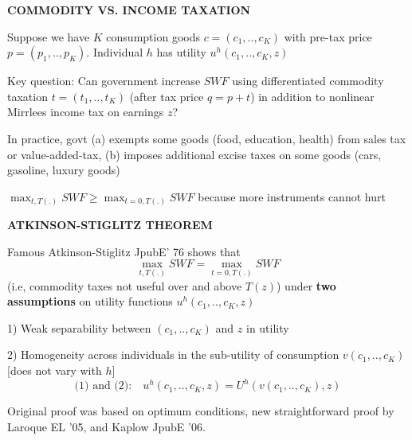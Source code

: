 \documentclass[landscape]{slides}
\begin{document}
\begin{slide}
\begin{center}
{\bf COMMODITY VS. INCOME TAXATION}
\end{center}
Suppose we have $K$ consumption goods $c=(c_1,..,c_K)$ with
pre-tax price $p=(p_1,..,p_K)$. Individual $h$ has utility
$u^h(c_1,..,c_K,z)$

Key question: Can government increase $SWF$ using differentiated
commodity taxation $t=(t_1,..,t_K)$ (after tax price $q=p+t$) in
addition to nonlinear Mirrlees income tax on earnings $z$?

In practice, govt (a) exempts some goods (food, education, health)
from sales tax or value-added-tax, (b) imposes additional excise
taxes on some goods (cars, gasoline, luxury goods)

$\max_{t,T(.)} SWF \geq \max_{t=0,T(.)} SWF$ because more
instruments cannot hurt

\end{slide}

\begin{slide}
\begin{center}
{\bf ATKINSON-STIGLITZ THEOREM }
\end{center}

Famous Atkinson-Stiglitz JpubE' 76 shows that $$\max_{t,T(.)} SWF
= \max_{t=0,T(.)} SWF$$ (i.e, commodity taxes not useful over and above $T(z)$) under
\textbf{two assumptions} on utility functions $u^h(c_1,..,c_K,z)$

1) Weak separability between $(c_1,..,c_K)$ and $z$ in utility

2) Homogeneity across individuals in the sub-utility of
consumption $v(c_1,..,c_K)$ [does not vary with $h$]
\[ \text{(1) and (2):} \quad u^h(c_1,..,c_K,z)=U^h(v(c_1,..,c_K),z) \]


Original proof was based on optimum conditions, new
straightforward proof by Laroque EL '05, and Kaplow JpubE '06.

\end{slide}
\end{document}
